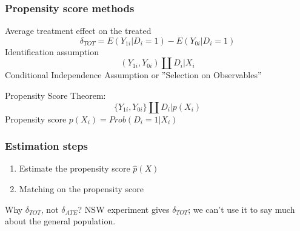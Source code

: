 \documentclass[notes=show,beamer,compress]{beamer}
\begin{document}

\begin{frame}
\frametitle{Propensity score methods}

Average treatment effect on the treated
\[
	\delta_{TOT} = E(Y_{1i}|D_i=1)-E(Y_{0i}|D_i=1)
\]
Identification assumption
\[
	(Y_{1i}, Y_{0i}) \amalg D_i|X_i
\]
Conditional Independence Assumption or ''Selection on Observables''
\bigskip

Propensity Score Theorem:
\begin{equation*}
    \{Y_{1i},Y_{0i}\} \amalg D_i|p(X_i)
\end{equation*}
Propensity score $p(X_i)=Prob(D_i=1|X_i)$
\end{frame}

\begin{frame}
\frametitle{Estimation steps}

\begin{enumerate}

	\item Estimate the propensity score $\hat{p}(X)$
	\item Matching on the propensity score
	


\end{enumerate}
	Why $\delta_{TOT}$, not $\delta_{ATE}$? NSW experiment gives $\delta_{TOT}$; we can't use it to say much about the general population.
\end{frame}
\end{document}
